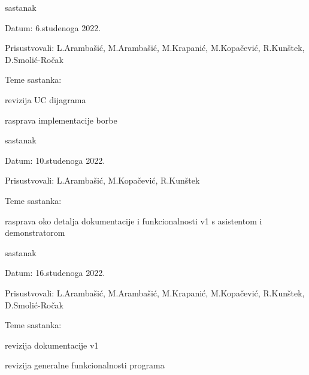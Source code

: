\begin{packed_enum}
			\item  sastanak
			\item[] \begin{packed_item}
				\item Datum: 6.studenoga 2022.
				\item Prisustvovali: L.Arambašić, M.Arambašić, M.Krapanić, M.Kopačević, R.Kunštek, D.Smolić-Ročak
				\item Teme sastanka:
				\begin{packed_item}
					\item  revizija UC dijagrama
					\item  rasprava implementacije borbe
				\end{packed_item}
			\end{packed_item}
		
			\item  sastanak
			\item[] \begin{packed_item}
				\item Datum: 10.studenoga 2022.
				\item Prisustvovali: L.Arambašić, M.Kopačević, R.Kunštek
				\item Teme sastanka:
				\begin{packed_item}
					\item  rasprava oko detalja dokumentacije i funkcionalnosti v1 s asistentom i demonstratorom
				\end{packed_item}
			\end{packed_item}
		
			\item  sastanak
			\item[] \begin{packed_item}
				\item Datum: 16.studenoga 2022.
				\item Prisustvovali: L.Arambašić, M.Arambašić, M.Krapanić, M.Kopačević, R.Kunštek, D.Smolić-Ročak
				\item Teme sastanka:
				\begin{packed_item}
					\item  revizija dokumentacije v1 
					\item  revizija generalne funkcionalnosti programa
				\end{packed_item}
			\end{packed_item}
			
			
		\end{packed_enum}
		

